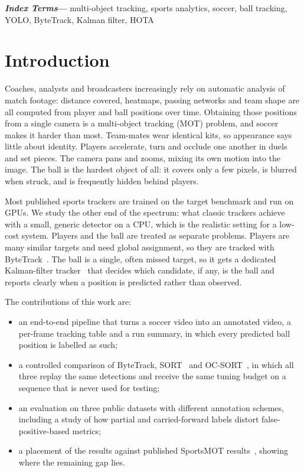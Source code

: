 \documentclass[11pt,a4paper]{article}
\newenvironment{IEEEkeywords}{\par\smallskip\noindent\textbf{\textit{Index Terms}---}}{\par}
\begin{document}
\begin{IEEEkeywords}
multi-object tracking, sports analytics, soccer, ball tracking, YOLO, ByteTrack,
Kalman filter, HOTA
\end{IEEEkeywords}

\section{Introduction}
Coaches, analysts and broadcasters increasingly rely on automatic analysis of
match footage: distance covered, heatmaps, passing networks and team shape are
all computed from player and ball positions over time. Obtaining those
positions from a single camera is a multi-object tracking (MOT) problem, and
soccer makes it harder than most. Team-mates wear identical kits, so appearance
says little about identity. Players accelerate, turn and occlude one another in
duels and set pieces. The camera pans and zooms, mixing its own motion into the
image. The ball is the hardest object of all: it covers only a few pixels, is
blurred when struck, and is frequently hidden behind players.

Most published sports trackers are trained on the target benchmark and run on
GPUs. We study the other end of the spectrum: what classic trackers achieve with
a small, generic detector on a CPU, which is the realistic setting for a
low-cost system. Players and the ball are treated as separate problems. Players
are many similar targets and need global assignment, so they are tracked with
ByteTrack~\cite{bytetrack}. The ball is a single, often missed target, so it gets
a dedicated Kalman-filter tracker~\cite{kalman} that decides which candidate, if
any, is the ball and reports clearly when a position is predicted rather than
observed.

The contributions of this work are:
\begin{itemize}
\item an end-to-end pipeline that turns a soccer video into an annotated video, a
per-frame tracking table and a run summary, in which every predicted ball
position is labelled as such;
\item a controlled comparison of ByteTrack, SORT~\cite{sort} and
OC-SORT~\cite{ocsort}, in which all three replay the same detections and receive
the same tuning budget on a sequence that is never used for testing;
\item an evaluation on three public datasets with different annotation schemes,
including a study of how partial and carried-forward labels distort
false-positive-based metrics;
\item a placement of the results against published SportsMOT
results~\cite{sportsmot,deepeiou,diffmot}, showing where the remaining gap lies.
\end{itemize}
\end{document}
